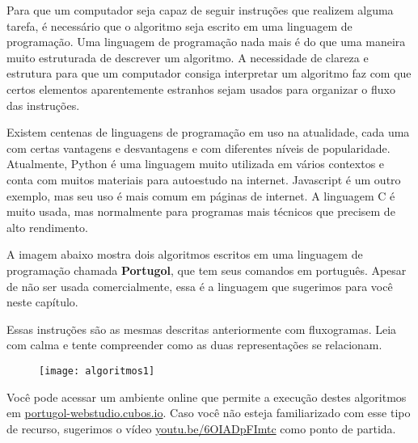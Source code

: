 \label{comp-know1}

Para que um computador seja capaz de seguir instruções que realizem alguma tarefa, é necessário que o algoritmo seja escrito em uma linguagem de programação. Uma linguagem de programação nada mais é do que uma maneira muito estruturada de descrever um algoritmo. A necessidade de clareza e estrutura para que um computador consiga interpretar um algoritmo faz com que certos elementos aparentemente estranhos sejam usados para organizar o fluxo das instruções.

\begin{knowledge}
Existem centenas de linguagens de programação em uso na atualidade, cada uma com certas vantagens e desvantagens e com diferentes níveis de popularidade. Atualmente, Python é uma linguagem muito utilizada em vários contextos e conta com muitos materiais para autoestudo na internet. Javascript é um outro exemplo, mas seu uso é mais comum em páginas de internet. A linguagem C é muito usada, mas normalmente para programas mais técnicos que precisem de alto rendimento.
\end{knowledge}

A imagem abaixo mostra dois algoritmos escritos em uma linguagem de programação chamada \textbf{Portugol}, que tem seus comandos em português. Apesar de não ser usada comercialmente, essa é a linguagem que sugerimos para você neste capítulo.

Essas instruções são as mesmas descritas anteriormente com fluxogramas. Leia com calma e tente compreender como as duas representações se relacionam.

\begin{figure}[H]
\centering

\texttt{[image: algoritmos1]}
\end{figure}

Você pode acessar um ambiente online que permite a execução destes algoritmos em \url{portugol-webstudio.cubos.io}. Caso você não esteja familiarizado com esse tipo de recurso, sugerimos o vídeo \url{youtu.be/6OIADpFImtc} como ponto de partida.

\cleardoublepage

